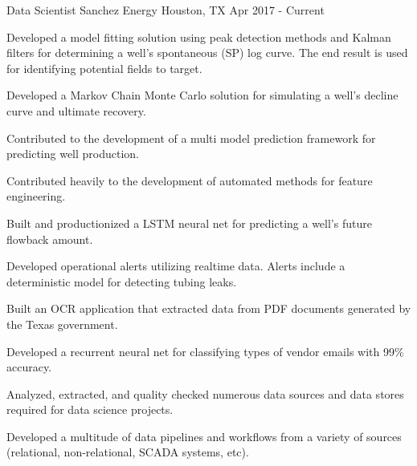 


\begin{cventries}


\cventry
{Data Scientist} %
{Sanchez Energy} %
{Houston, TX} %
{Apr 2017 - Current} %
{ %
\begin{cvitems}
\item {Developed a model fitting solution using peak detection methods and Kalman filters for determining a well's spontaneous (SP) log curve.
        The end result is used for identifying potential fields to target.}
\item {Developed a Markov Chain Monte Carlo solution for simulating a well's decline curve and ultimate recovery.}
\item {Contributed to the development of a multi model prediction framework for predicting well production.}
\item {Contributed heavily to the development of automated methods for feature engineering.}
\item {Built and productionized a LSTM neural net for predicting a well's future flowback amount.}
\item {Developed operational alerts utilizing realtime data. Alerts include a deterministic model for detecting tubing leaks.}
\item {Built an OCR application that extracted data from PDF documents generated by the Texas government.}
\item {Developed a recurrent neural net for classifying types of vendor emails with 99\% accuracy.}
\item {Analyzed, extracted, and quality checked numerous data sources and data stores required for data science projects.}
\item {Developed a multitude of data pipelines and workflows from a variety of sources (relational, non-relational, SCADA systems, etc).}
\end{cvitems}
}


\end{cventries}

